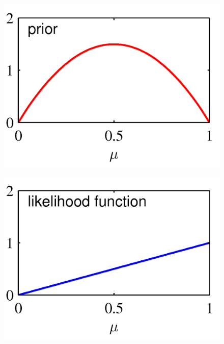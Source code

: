 \documentclass[b5paper]{book}
\numberwithin{equation}{chapter}
\begin{document}
{	\begin{figure}[ht]
	\centering
		\begin{minipage}[t]{0.3\linewidth}
		\centering
		\includegraphics[scale=0.8]{Images/2-3a.png}
		\label{fig:2-3a}
		\end{minipage}
		\begin{minipage}[t]{0.3\linewidth}
		\centering
		\includegraphics[scale=0.8]{Images/2-3b.png}
		\label{fig:2-3b}
		\end{minipage}
		\begin{minipage}[t]{0.3\linewidth}
		\centering

\end{minipage}
\end{figure}}
\end{document}
